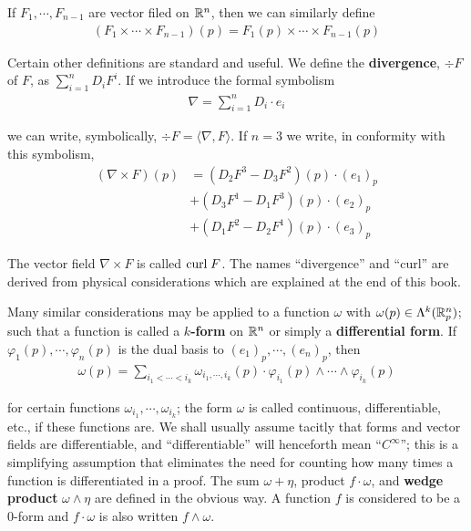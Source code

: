 If $F_1,\cdots,F_{n-1}$ are vector filed on $\mathbb{R}^n$, then we can 
similarly define 
\begin{align*}
    (F_1\times\cdots\times F_{n-1})(p) = F_1(p)\times\cdots\times F_{n-1}(p)
\end{align*}

Certain other definitions are standard and useful. We define the \textbf{divergence}, 
$\div F$ of $F$, as $\sum_{i=1}^{n}{D_iF^i}$. If we introduce the formal symbolism
\begin{align*}
    \nabla = \sum_{i=1}^{n}{D_i\cdot e_i}
\end{align*}

we can write, symbolically, $\div F = \langle \nabla, F\rangle$. If $n=3$
we write, in conformity with this symbolism,
\begin{align*}
    (\nabla\times F)(p) 
    & = (D_2F^3 - D_3F^2)(p)\cdot (e_1)_p \\
    & + (D_3F^1 - D_1F^3)(p)\cdot (e_2)_p \\
    & + (D_1F^2 - D_2F^1)(p)\cdot (e_3)_p
\end{align*}

The vector field $\nabla\times F$ is called $\mathrm{curl}\; F$.
The names ``divergence'' and ``curl'' are derived from physical considerations
which are explained at the end of this book. 

Many similar considerations may be applied to a function $\omega$ with 
$\omega(p)\in \Lambda^k(\mathbb{R}^n_p)$; such that a function is called a 
$k$\textbf{-form} on $\mathbb{R}^n$ or simply a \textbf{differential form}.
If $\varphi_1(p),\cdots,\varphi_n(p)$ is the dual basis to $(e_1)_p,\cdots,(e_n)_p$, then 
\begin{align*}
    \omega(p) = \sum_{i_1<\cdots<i_k}{\omega_{i_1,\cdots,i_k}(p)\cdot \varphi_{i_1}(p)\wedge\cdots\wedge\varphi_{i_k}(p)}
\end{align*}

for certain functions $\omega_{i_1},\cdots,\omega_{i_k}$; the form $\omega$ 
is called continuous, differentiable, etc., if these functions are.
We shall usually assume tacitly that forms and vector fields are differentiable,
and ``differentiable'' will henceforth mean ``$C^\infty$''; this is a
simplifying assumption that eliminates the need for counting
how many times a function is differentiated in a proof.
The sum $\omega+\eta$, product $f \cdot \omega$, and \textbf{wedge product}
$\omega\wedge\eta$ are defined in the obvious way. A function $f$ is 
considered to be a 0-form and $f\cdot \omega$ is also written $f\wedge\omega$.

